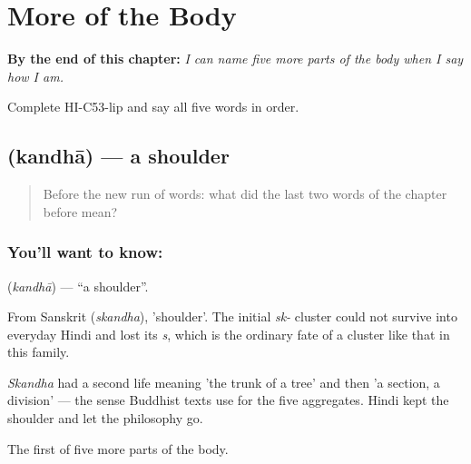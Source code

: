 
\chapter{More of the Body}
\label{ch:hi-more-of-the-body}

\begin{chapteropening}
\textbf{By the end of this chapter:} \emph{I can name five more parts of the body when I say how I am.}

Complete HI-C53-lip and say all five words in order.
\end{chapteropening}

\section[\texorpdfstring{\hi{कंधा} (kandhā)}{कंधा (kandhā)}]{ (kandhā) — a shoulder}

\label{lesson:HI-C53-shoulder}



\begin{quote}
Before the new run of words: what did the last two words of the chapter before mean?
\end{quote}

\subsection*{You'll want to know: }
\textbf{} (\emph{kandhā}) — \textquotedblleft{}a shoulder\textquotedblright{}.

From Sanskrit  (\emph{skandha}), 'shoulder'. The initial \emph{sk-} cluster could not survive into everyday Hindi and lost its \emph{s}, which is the ordinary fate of a cluster like that in this family.

\emph{Skandha} had a second life meaning 'the trunk of a tree' and then 'a section, a division' — the sense Buddhist texts use for the five aggregates. Hindi kept the shoulder and let the philosophy go.

\begin{grammarlens}[title={What you've built}]
The first of five more parts of the body.
\end{grammarlens}


